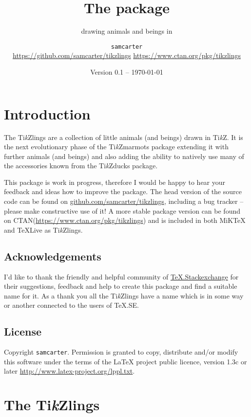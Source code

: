\documentclass[parskip=half]{scrartcl}
\title{The \texorpdfstring{\tikzlings}{tikzlings} package}
\subtitle{drawing animals and beings in \TikZ}
\author{%
	\texorpdfstring{\texttt{samcarter}\\[0.8em]
		\url{https://github.com/samcarter/tikzlings}
		\url{https://www.ctan.org/pkg/tikzlings}
	}{samcarter}}
\date{Version 0.1 -- \today}
\newcommand{\CTAN}{\textsc{CTAN}\xspace}
\newcommand{\TikZ}{Ti\emph{k}Z\xspace}
\newcommand{\tikzducks}{Ti\emph{k}Zducks\xspace}
\newcommand{\tikzmarmots}{Ti\emph{k}Zmarmots\xspace}
\newcommand{\tikzlings}{Ti\emph{k}Zlings\xspace}
\newcommand{\miktex}{MiK\TeX\xspace}
\newcommand{\texlive}{\TeX{}Live\xspace}
\begin{document}
\maketitle
\thispagestyle{scrheadings}

\section*{Introduction}
\label{intro}

The \tikzlings are a collection of little animals (and beings) drawn in \TikZ. It is the next evolutionary phase of the \tikzmarmots package extending it with further animals (and beings) and also adding the ability to natively use many of the accessories known from the \tikzducks package. 

This package is work in progress, therefore I would be happy to hear your feedback and ideas how to improve the package. 
The head version of the source code can be found on \url{github.com/samcarter/tikzlings}, including a bug tracker -- please make constructive use of it! 
A more stable package version can be found on \CTAN (\url{https://www.ctan.org/pkg/tikzlings}) and is included in both \miktex and \texlive as \tikzlings. 

\subsection*{Acknowledgements}

I'd like to thank the friendly and helpful community of \href{https://tex.stackexchange.com/}{TeX.Stackexchange} for their suggestions, feedback and help to create this package and find a suitable name for it. As a thank you all the \tikzlings have a name which is in some way or another connected to the users of TeX.SE.

\subsection*{License}

Copyright 
\texttt{samcarter}. Permission is granted to copy, distribute and\slash or modify this software under the terms of the LaTeX project public licence, version 1.3c or later \url{http://www.latex-project.org/lppl.txt}.

\clearpage
\section*{The \tikzlings}
\end{document}
